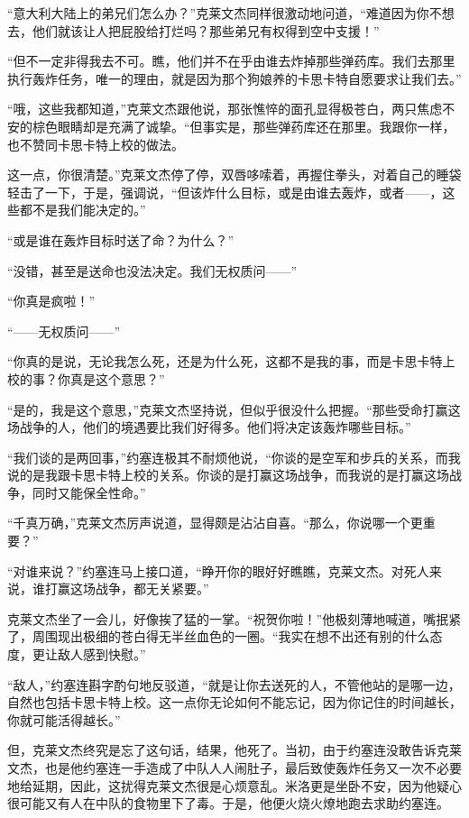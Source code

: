     “意大利大陆上的弟兄们怎么办？”克莱文杰同样很激动地问道，“难道因为你不想去，他们就该让人把屁股给打烂吗？那些弟兄有权得到空中支援！”

    “但不一定非得我去不可。瞧，他们并不在乎由谁去炸掉那些弹药库。我们去那里执行轰炸任务，唯一的理由，就是因为那个狗娘养的卡思卡特自愿要求让我们去。”

    “哦，这些我都知道，”克莱文杰跟他说，那张憔悴的面孔显得极苍白，两只焦虑不安的棕色眼睛却是充满了诚挚。“但事实是，那些弹药库还在那里。我跟你一样，也不赞同卡思卡特上校的做法。

    这一点，你很清楚。”克莱文杰停了停，双唇哆嗦着，再握住拳头，对着自己的睡袋轻击了一下，于是，强调说，“但该炸什么目标，或是由谁去轰炸，或者——，这些都不是我们能决定的。”

    “或是谁在轰炸目标时送了命？为什么？”

    “没错，甚至是送命也没法决定。我们无权质问——”

    “你真是疯啦！”

    “——无权质问——”

    “你真的是说，无论我怎么死，还是为什么死，这都不是我的事，而是卡思卡特上校的事？你真是这个意思？”

    “是的，我是这个意思，”克莱文杰坚持说，但似乎很没什么把握。“那些受命打赢这场战争的人，他们的境遇要比我们好得多。他们将决定该轰炸哪些目标。”

    “我们谈的是两回事，”约塞连极其不耐烦他说，“你谈的是空军和步兵的关系，而我说的是我跟卡思卡特上校的关系。你谈的是打赢这场战争，而我说的是打赢这场战争，同时又能保全性命。”

    “千真万确，”克莱文杰厉声说道，显得颇是沾沾自喜。“那么，你说哪一个更重要？”

    “对谁来说？”约塞连马上接口道，“睁开你的眼好好瞧瞧，克莱文杰。对死人来说，谁打赢这场战争，都无关紧要。”

    克莱文杰坐了一会儿，好像挨了猛的一掌。“祝贺你啦！”他极刻薄地喊道，嘴抿紧了，周围现出极细的苍白得无半丝血色的一圈。“我实在想不出还有别的什么态度，更让敌人感到快慰。”
 


    “敌人，”约塞连斟字酌句地反驳道，“就是让你去送死的人，不管他站的是哪一边，自然也包括卡思卡特上校。这一点你无论如何不能忘记，因为你记住的时间越长，你就可能活得越长。”

    但，克莱文杰终究是忘了这句话，结果，他死了。当初，由于约塞连没敢告诉克莱文杰，也是他约塞连一手造成了中队人人闹肚子，最后致使轰炸任务又一次不必要地给延期，因此，这扰得克莱文杰很是心烦意乱。米洛更是坐卧不安，因为他疑心很可能又有人在中队的食物里下了毒。于是，他便火烧火燎地跑去求助约塞连。

